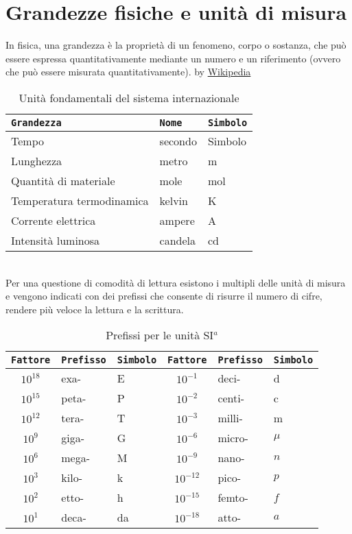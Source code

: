 \chapter{Grandezze fisiche e unità di misura}
In fisica, una grandezza è la proprietà di un fenomeno, corpo o sostanza, che può essere espressa quantitativamente mediante un numero e un riferimento (ovvero che può essere misurata quantitativamente). by \href{https://it.wikipedia.org/wiki/Grandezza_fisica}{Wikipedia}
\begin{table}[!h]
	\centering
	\begin{tabular}{lll}
		\texttt{Grandezza}&\texttt{Nome}&\texttt{Simbolo}\\\hline
		Tempo&secondo&Simbolo\\
		Lunghezza&metro&m\\
		Quantità di materiale&mole&mol\\
		Temperatura termodinamica&kelvin&K\\
		Corrente elettrica&ampere&A\\
		Intensità luminosa&candela&cd\\\hline
	\end{tabular}
\caption{Unità fondamentali del sistema internazionale}
\label{table:1}
\end{table}\\
Per una questione di comodità di lettura esistono i multipli delle unità di
misura e vengono indicati con dei prefissi che consente di risurre il numero di
cifre, rendere più veloce la lettura e la scrittura.
\begin{table}[!h]
	\centering
	\begin{tabular}{cll|cll}
		\texttt{Fattore}&\texttt{Prefisso}&\texttt{Simbolo}&\texttt{Fattore}&\texttt{Prefisso}&\texttt{Simbolo}\\\hline
		$10^{18}$&exa-&E&$10^{-1}$&deci-&d\\
		$10^{15}$&peta-&P&$10^{-2}$&centi-&c\\
		$10^{12}$&tera-&T&$10^{-3}$&milli-&m\\
		$10^{9}$&giga-&G&$10^{-6}$&micro-&$\mu$\\
		$10^{6}$&mega-&M&$10^{-9}$&nano-&$n$\\
		$10^{3}$&kilo-&k&$10^{-12}$&pico-&$p$\\
		$10^{2}$&etto-&h&$10^{-15}$&femto-&$f$\\
		$10^{1}$&deca-&da&$10^{-18}$&atto-&$a$\\\hline

	\end{tabular}
\caption{Prefissi per le unità SI$^a$}
\end{table}
